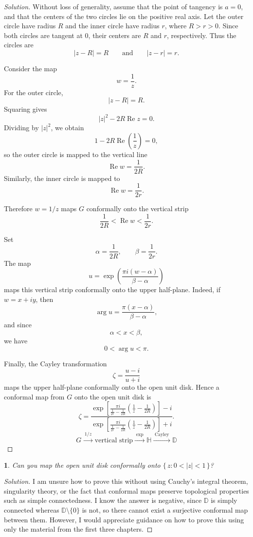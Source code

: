 \documentclass[12pt, a4paper]{report}
\theoremstyle{spaced}
\newtheorem{exercise}{}
\newcommand{\setexercise}[1]{\setcounter{exercise}{#1-1}}
\begin{document}
\begin{proof}[Solution]
	Without loss of generality, assume that the point of tangency is \(a=0\), and that the centers of the two circles lie on the positive real axis. Let the outer circle have radius \(R\) and the inner circle have radius \(r\), where \(R>r>0\). Since both circles are tangent at \(0\), their centers are \(R\) and \(r\), respectively. Thus the circles are
	\[
		|z-R|=R
		\qquad\text{and}\qquad
		|z-r|=r.
	\]

	Consider the map
	\[
		w=\frac{1}{z}.
	\]
	For the outer circle,
	\[
		|z-R|=R.
	\]
	Squaring gives
	\[
		|z|^2-2R\operatorname{Re} z=0.
	\]
	Dividing by \(|z|^2\), we obtain
	\[
		1-2R\operatorname{Re}\left(\frac{1}{z}\right)=0,
	\]
	so the outer circle is mapped to the vertical line
	\[
		\operatorname{Re} w=\frac{1}{2R}.
	\]
	Similarly, the inner circle is mapped to
	\[
		\operatorname{Re} w=\frac{1}{2r}.
	\]

	Therefore \(w=1/z\) maps \(G\) conformally onto the vertical strip
	\[
		\frac{1}{2R}<\operatorname{Re} w<\frac{1}{2r}.
	\]

	Set
	\[
		\alpha=\frac{1}{2R},
		\qquad
		\beta=\frac{1}{2r}.
	\]
	The map
	\[
		u=\exp\left(\frac{\pi i(w-\alpha)}{\beta-\alpha}\right)
	\]
	maps this vertical strip conformally onto the upper half-plane. Indeed, if
	\(w=x+iy\), then
	\[
		\arg u=\frac{\pi(x-\alpha)}{\beta-\alpha},
	\]
	and since
	\[
		\alpha<x<\beta,
	\]
	we have
	\[
		0<\arg u<\pi.
	\]

	Finally, the Cayley transformation
	\[
		\zeta=\frac{u-i}{u+i}
	\]
	maps the upper half-plane conformally onto the open unit disk.
	Hence a conformal map from \(G\) onto the open unit disk is
	\[
		\zeta=
		\frac{
			\exp\left[
				\frac{\pi i}{\frac{1}{2r}-\frac{1}{2R}}
				\left(
				\frac{1}{z}-\frac{1}{2R}
				\right)
				\right]-i
		}{
			\exp\left[
				\frac{\pi i}{\frac{1}{2r}-\frac{1}{2R}}
				\left(
				\frac{1}{z}-\frac{1}{2R}
				\right)
				\right]+i
		}.
	\]
	\[
		\boxed{
			G
			\xrightarrow{\;1/z\;}
			\text{vertical strip}
			\xrightarrow{\;\exp\;}
			\mathbb{H}
			\xrightarrow{\;\text{Cayley}\;}
			\mathbb{D}
		}
	\]
\end{proof}

\setexercise{15}
\begin{exercise}
	Can you map the open unit disk conformally onto \(\{\,z: 0<|z|<1\,\}\)?
\end{exercise}

\begin{proof}[Solution]
	I am unsure how to prove this without using Cauchy’s integral theorem, singularity theory, or the fact that conformal maps preserve topological properties such as simple connectedness. I know the answer is negative, since $\mathbb{D}$ is simply connected whereas $\mathbb{D}\setminus\{0\}$ is not, so there cannot exist a surjective conformal map between them.
	However, I would appreciate guidance on how to prove this using only the material from the first three chapters.
\end{proof}
\end{document}
